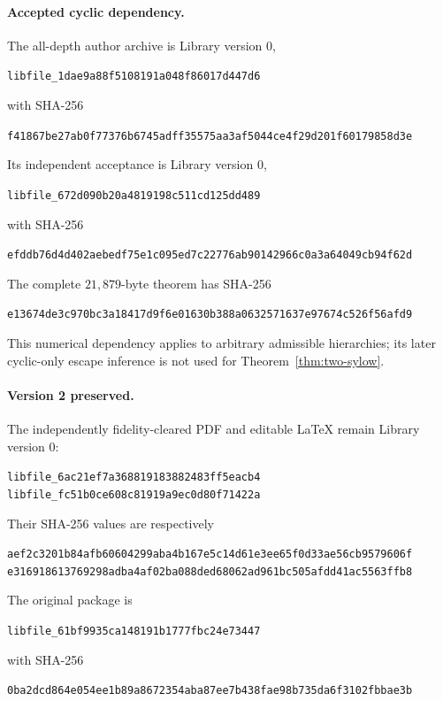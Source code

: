 \documentclass[11pt,letterpaper]{article}
\theoremstyle{definition}\newtheorem{definition}{Definition}
\newcommand{\hash}[1]{{\small\ttfamily\nolinkurl{#1}}}
\begin{document}
\paragraph{Accepted cyclic dependency.}
The all-depth author archive is Library version $0$,
\begin{center}\hash{libfile_1dae9a88f5108191a048f86017d447d6}\end{center}
with SHA-256
\begin{center}\hash{f41867be27ab0f77376b6745adff35575aa3af5044ce4f29d201f60179858d3e}\end{center}
Its independent acceptance is Library version $0$,
\begin{center}\hash{libfile_672d090b20a4819198c511cd125dd489}\end{center}
with SHA-256
\begin{center}\hash{efddb76d4d402aebedf75e1c095ed7c22776ab90142966c0a3a64049cb94f62d}\end{center}
The complete $21{,}879$-byte theorem has SHA-256
\begin{center}\hash{e13674de3c970bc3a18417d9f6e01630b388a0632571637e97674c526f56afd9}\end{center}
This numerical dependency applies to arbitrary admissible hierarchies; its later cyclic-only escape inference is not used for Theorem~\ref{thm:two-sylow}.

\paragraph{Version 2 preserved.}
The independently fidelity-cleared PDF and editable LaTeX remain Library version $0$:
\begin{center}\hash{libfile_6ac21ef7a368819183882483ff5eacb4}\\[3pt]
\hash{libfile_fc51b0ce608c81919a9ec0d80f71422a}\end{center}
Their SHA-256 values are respectively
\begin{center}\hash{aef2c3201b84afb60604299aba4b167e5c14d61e3ee65f0d33ae56cb9579606f}\\[3pt]
\hash{e316918613769298adba4af02ba088ded68062ad961bc505afdd41ac5563ffb8}\end{center}
The original package is
\begin{center}\hash{libfile_61bf9935ca148191b1777fbc24e73447}\end{center}
with SHA-256
\begin{center}\hash{0ba2dcd864e054ee1b89a8672354aba87ee7b438fae98b735da6f3102fbbae3b}\end{center}
\end{document}

